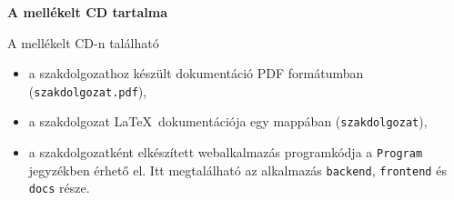 \label{Chap:CD}
\pagestyle{empty}

\noindent \textbf{\Large A mellékelt CD tartalma}

\vskip 1cm

A mellékelt CD-n található

\begin{itemize}
\item a szakdolgozathoz készült dokumentáció PDF formátumban (\texttt{szakdolgozat.pdf}), 
\item a szakdolgozat \LaTeX \ dokumentációja egy mappában (\texttt{szakdolgozat}),
\item a szakdolgozatként elkészített webalkalmazás programkódja a \texttt{Program} jegyzékben érhető el. Itt megtalálható az alkalmazás \texttt{backend}, \texttt{frontend} és \texttt{docs} része.
\end{itemize}